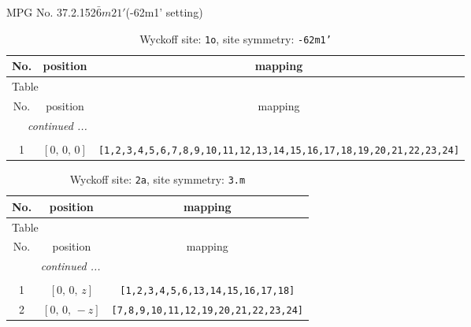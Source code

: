 \documentclass[fleqn,8pt]{jsarticle}
\begin{document}
\setcounter{MaxMatrixCols}{32}

\renewcommand{\tablename}{Table~}
\renewcommand{\figurename}{Figure~}
\begin{center}
\LARGE
MPG No. 37.2.152\quad$\bar{6}m21'$\quad(-62m1' setting)
\end{center}
\renewcommand{\arraystretch}{1.2}
\begin{longtable}{ccc}
\caption{Wyckoff site: {\tt 1o}, site symmetry: {\tt -62m1'}}
 \\
 \hline \hline
No. & position & mapping \\ \hline \endfirsthead

\multicolumn{2}{l}{\tablename\ \thetable{}} \\
 \hline \hline
No. & position & mapping \\ \hline \endhead

 \hline \hline
\multicolumn{2}{r}{\footnotesize\it continued ...} \\ \endfoot

 \hline \hline
\multicolumn{2}{r}{} \\ \endlastfoot

1 & $\left[ 0,\, 0,\, 0 \right]$ & {\tt [1,2,3,4,5,6,7,8,9,10,11,12,13,14,15,16,17,18,19,20,21,22,23,24]} \\
\end{longtable}
\renewcommand{\arraystretch}{1.2}
\begin{longtable}{ccc}
\caption{Wyckoff site: {\tt 2a}, site symmetry: {\tt 3.m}}
 \\
 \hline \hline
No. & position & mapping \\ \hline \endfirsthead

\multicolumn{2}{l}{\tablename\ \thetable{}} \\
 \hline \hline
No. & position & mapping \\ \hline \endhead

 \hline \hline
\multicolumn{2}{r}{\footnotesize\it continued ...} \\ \endfoot

 \hline \hline
\multicolumn{2}{r}{} \\ \endlastfoot

1 & $\left[ 0,\, 0,\, z \right]$ & {\tt [1,2,3,4,5,6,13,14,15,16,17,18]} \\ \hline
2 & $\left[ 0,\, 0,\, - z \right]$ & {\tt [7,8,9,10,11,12,19,20,21,22,23,24]} \\
\end{longtable}
\renewcommand{\arraystretch}{1.2}
\end{document}
